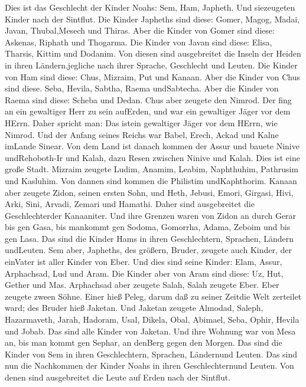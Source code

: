  Dies ist das Geschlecht der Kinder Noahs: Sem, Ham,
Japheth. Und siezeugeten Kinder nach der Sintflut.  Die
Kinder Japheths sind diese: Gomer, Magog, Madai, Javan, Thubal,Mesech
und Thiras.  Aber die Kinder von Gomer sind diese: Askenas,
Riphath und Thogarma.  Die Kinder von Javan sind diese:
Elisa, Tharsis, Kittim und Dodanim.  Von diesen sind
ausgebreitet die Inseln der Heiden in ihren Ländern,jegliche nach ihrer
Sprache, Geschlecht und Leuten.  Die Kinder von Ham sind
diese: Chus, Mizraim, Put und Kanaan.  Aber die Kinder von
Chus sind diese. Seba, Hevila, Sabtha, Raema undSabtecha. Aber die
Kinder von Raema sind diese: Scheba und Dedan.  Chus aber
zeugete den Nimrod. Der fing an ein gewaltiger Herr zu sein aufErden,
 und war ein gewaltiger Jäger vor dem HErrn. Daher spricht
man: Das istein gewaltiger Jäger vor dem HErrn, wie Nimrod.
 Und der Anfang seines Reichs war Babel, Erech, Ackad und
Kalne imLande Sinear.  Von dem Land ist danach kommen der
Assur und bauete Ninive undRehoboth-Ir und Kalah,  dazu
Resen zwischen Ninive und Kalah. Dies ist eine große Stadt.
 Mizraim zeugete Ludim, Anamim, Leabim, Naphthuhim,
 Pathrusim und Kasluhim. Von dannen sind kommen die
Philistim undKaphthorim.  Kanaan aber zeugete Zidon, seinen
ersten Sohn, und Heth,  Jebusi, Emori, Girgasi,
 Hivi, Arki, Sini,  Arvadi, Zemari und
Hamathi. Daher sind ausgebreitet die Geschlechterder Kanaaniter.
 Und ihre Grenzen waren von Zidon an durch Gerar bis gen
Gasa, bis mankommt gen Sodoma, Gomorrha, Adama, Zeboim und bis gen Lasa.
 Das sind die Kinder Hams in ihren Geschlechtern, Sprachen,
Ländern undLeuten.  Sem aber, Japheths, des größern,
Bruder, zeugete auch Kinder, der einVater ist aller Kinder von Eber.
 Und dies sind seine Kinder: Elam, Assur, Arphachsad, Lud
und Aram.  Die Kinder aber von Aram sind diese: Uz, Hut,
Gether und Mas.  Arphachsad aber zeugete Salah, Salah
zeugete Eber.  Eber zeugete zween Söhne. Einer hieß Peleg,
darum daß zu seiner Zeitdie Welt zerteilet ward; des Bruder hieß
Jaketan.  Und Jaketan zeugete Almodad, Saleph, Hazarmaveth,
Jarah,  Hadoram, Usal, Dikela,  Obal, Abimael,
Seba,  Ophir, Hevila und Jobab. Das sind alle Kinder von
Jaketan.  Und ihre Wohnung war von Mesa an, bis man kommt
gen Sephar, an denBerg gegen den Morgen.  Das sind die
Kinder von Sem in ihren Geschlechtern, Sprachen, Ländernund Leuten.
 Das sind nun die Nachkommen der Kinder Noahs in ihren
Geschlechternund Leuten. Von denen sind ausgebreitet die Leute auf Erden
nach der Sintflut.

